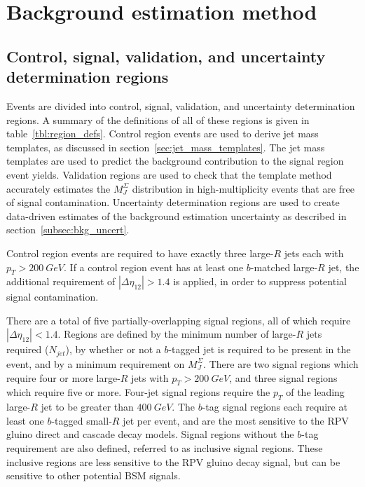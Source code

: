 \chapter{Background estimation method}\label{ch:background_method}

\section{Control, signal, validation, and uncertainty determination regions} \label{sec:region_defs}
Events are divided into control, signal, validation, and uncertainty determination regions.
A summary of the definitions of all of these regions is given in table~\ref{tbl:region_defs}.
Control region events are used to derive jet mass templates, as discussed in section~\ref{sec:jet_mass_templates}.
The jet mass templates are used to predict the background contribution to the signal region event yields.
Validation regions are used to check that the template method accurately estimates the $M_J^{\Sigma}$ distribution in high-multiplicity events that are free of signal contamination.
Uncertainty determination regions are used to create data-driven estimates of the background estimation uncertainty as described in section~\ref{subsec:bkg_uncert}.

Control region events are required to have exactly three large-$R$ jets each with $p_{T}>200~GeV$.
If a control region event has at least one $b$-matched large-$R$ jet, the additional requirement of $|\Delta\eta_{12}|>1.4$ is applied, in order to suppress potential signal contamination.

There are a total of five partially-overlapping signal regions, all of which require $|\Delta\eta_{12}|<1.4$.
Regions are defined by the minimum number of large-$R$ jets required ($N_{jet}$), by whether or not a $b$-tagged jet is required to be present in the event, and by a minimum requirement on $M_{J}^{\Sigma}$.
There are two signal regions which require four or more large-$R$ jets with $p_{T}>200~GeV$, and three signal regions which require five or more.
Four-jet signal regions require the $p_T$ of the leading large-$R$ jet to be greater than $400~GeV$.
The $b$-tag signal regions each require at least one $b$-tagged small-$R$ jet per event, and are the most sensitive to the RPV gluino direct and cascade decay models.
Signal regions without the $b$-tag requirement are also defined, referred to as inclusive signal regions.
These inclusive regions are less sensitive to the RPV gluino decay signal, but can be sensitive to other potential BSM signals.

